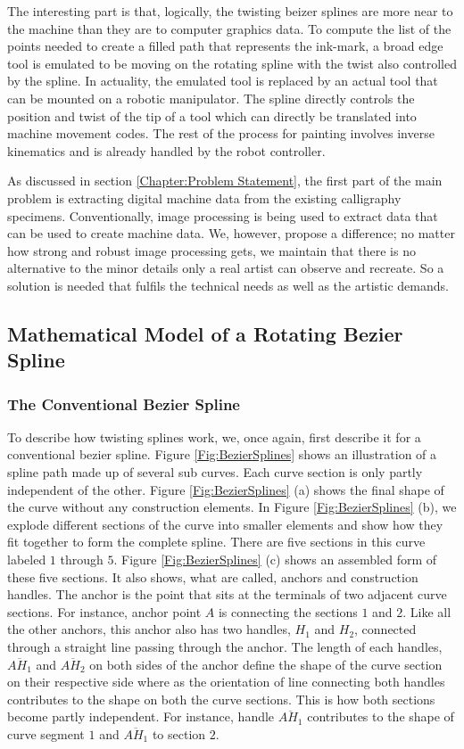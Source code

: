     The interesting part is that, logically, the twisting beizer splines are more near to the machine than they are to computer graphics data. To compute the list of the points needed to create a filled path that represents the ink-mark, a broad edge tool is emulated to be moving on the rotating spline with the twist also controlled by the spline. In actuality, the emulated tool is replaced by an actual tool that can be mounted on a robotic manipulator. The spline directly controls the position and twist of the tip of a tool which can directly be translated into machine movement codes. The rest of the process for painting involves inverse kinematics and is already handled by the robot controller.

    As discussed in section \ref{Chapter:Problem Statement}, the first part of the main problem is extracting digital machine data from the existing calligraphy specimens. Conventionally, image processing is being used to extract data that can be used to create machine data. We, however, propose a difference; no matter how strong and robust image processing gets, we maintain that there is no alternative to the minor details only a real artist can observe and recreate. So a solution is needed that fulfils the technical needs as well as the artistic demands.

    \subsection{Mathematical Model of a Rotating Bezier Spline}
    \subsubsection{The Conventional Bezier Spline}
         To describe how twisting splines work, we, once again, first describe it for a conventional bezier spline. Figure \ref{Fig:BezierSplines} shows an illustration of a spline path made up of several sub curves. Each curve section is only partly independent of the other. Figure \ref{Fig:BezierSplines} (a) shows the final shape of the curve without any construction elements. In Figure \ref{Fig:BezierSplines} (b), we explode different sections of the curve into smaller elements and show how they fit together to form the complete spline. There are five sections in this curve labeled $1$ through $5$. Figure \ref{Fig:BezierSplines} (c) shows an assembled form of these five sections. It also shows, what are called, anchors and construction handles. The anchor is the point that sits at the terminals of two adjacent curve sections. For instance, anchor point $A$  is connecting the sections $1$ and $2$. Like all the other anchors, this anchor also has two handles, $H_1$ and $H_2$, connected through a straight line passing through the anchor. The length of each handles, $\overline{AH_1}$  and $\overline{AH_2}$ on both sides of the anchor define the shape of the curve section on their respective side where as the orientation of line connecting both handles contributes to the shape on both the curve sections. This is how both sections become partly independent. For instance, handle $\overline{AH_1}$ contributes to the shape of curve segment $1$ and $\overline{AH_1}$ to section $2$.


